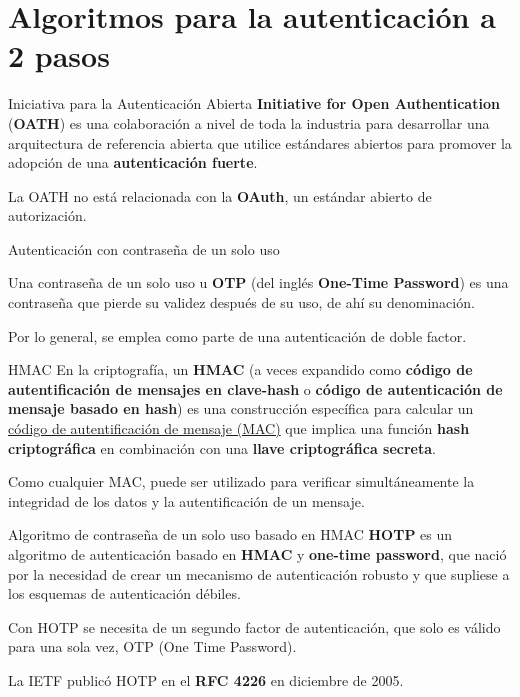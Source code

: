 \section{Algoritmos para la autenticación a 2 pasos}

\begin{frame}[c]{Iniciativa para la Autenticación Abierta}
  \textbf{Initiative for Open Authentication} (\textbf{OATH}) es una
  colaboración a nivel de toda la industria para desarrollar una arquitectura
  de referencia abierta que utilice estándares abiertos para promover la
  adopción de una \textbf{autenticación fuerte}. 

  \vspace{\baselineskip}
  La OATH no está relacionada con la \textbf{OAuth}, un estándar
  abierto de autorización. 
\end{frame}

\begin{frame}[c]{Autenticación con contraseña de un solo uso}

  Una contraseña de un solo uso u \textbf{OTP} (del inglés
  \textbf{One-Time Password}) es una contraseña que pierde su
  validez después de su uso, de ahí su denominación.

  \vspace{\baselineskip}
  Por lo general, se emplea como parte de una autenticación de
  doble factor.
\end{frame}

\begin{frame}[c]{HMAC}
  En la criptografía, un \textbf{HMAC} (a veces expandido como
  \textbf{código de autentificación de mensajes en clave-hash} o
  \textbf{código de autenticación de mensaje basado en hash}) es una
  construcción específica para calcular un \underline{código de
  autentificación de mensaje (MAC)} que implica una función
  \textbf{hash criptográfica} en combinación con una \textbf{llave
  criptográfica secreta}.

  \vspace{\baselineskip}
  Como cualquier MAC, puede ser utilizado para verificar simultáneamente
  la integridad de los datos y la autentificación de un mensaje. 
\end{frame}

\begin{frame}[c]{Algoritmo de contraseña de un solo uso basado en HMAC}
  \textbf{HOTP} es un algoritmo de autenticación basado en \textbf{HMAC}
  y \textbf{one-time password}, que nació por la necesidad de crear un
  mecanismo de autenticación robusto y que supliese a los esquemas de
  autenticación débiles.

  \vspace{\baselineskip}
  Con HOTP se necesita de un segundo factor de autenticación, que solo
  es válido para una sola vez, OTP (One Time Password).

  \vspace{\baselineskip}
  La IETF publicó HOTP en el \textbf{RFC 4226} en diciembre de 2005.
\end{frame}

